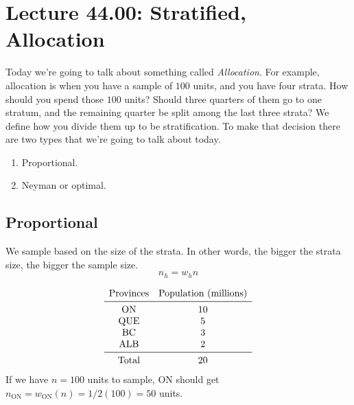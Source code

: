 \section{Lecture 44.00: Stratified, Allocation}
Today we're going to talk about something called \emph{Allocation}.
For example, allocation is when you have a sample of $100$ units,
and you have four strata. How should you spend those $100$ units?
Should three quarters of them go to one stratum, and the remaining quarter be split
among the last three strata? We define how you divide them up to be stratification.
To make that decision there are two types that we're going to talk about today.
\begin{enumerate}[(1)]
    \item Proportional.
    \item Neyman or optimal.
\end{enumerate}
\subsection*{Proportional}
We sample based on the size of the strata. In other words, the bigger
the strata size, the bigger the sample size.
\[ n_h=w_h n \]
\begin{Example}{}{}
    \[ \begin{matrix}
            \text{Provinces} & \text{Population (millions)} \\
            \midrule
            \text{ON}        & 10                           \\
            \text{QUE}       & 5                            \\
            \text{BC}        & 3                            \\
            \text{ALB}       & 2                            \\
            \midrule
            \text{Total}     & 20
        \end{matrix} \]
    If we have $ n=100 $ units to sample, ON should get $ n_{\text{ON}}=w_{\text{ON}}(n)=1/2(100)=50 $
    units.
\end{Example}
